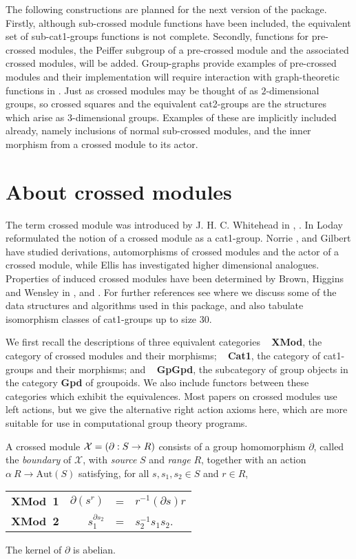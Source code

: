 The following constructions are planned for the next version of the package.
Firstly, although sub-crossed module functions have been included,
the equivalent set of sub-cat1-groups functions is not complete.
Secondly, functions for pre-crossed modules, the Peiffer subgroup of a
pre-crossed module and the associated crossed modules, will be added.
Group-graphs provide examples of pre-crossed modules and their
implementation will require interaction with graph-theoretic
functions in {\GAP}.
Just as crossed modules may be thought of as $2$-dimensional groups, so
crossed squares and the equivalent cat2-groups are the structures
which arise as $3$-dimensional groups.  
Examples of these are implicitly included already, namely inclusions of normal 
sub-crossed modules, and the inner morphism from a crossed module to its actor.


\section{About crossed modules}

The term crossed module was introduced by J. H. C. Whitehead in 
\cite{W2}, \cite{W1}.
In \cite{L1} Loday reformulated the notion of a 
crossed module as a cat1-group.
Norrie \cite{N1}, \cite{N2} and Gilbert \cite{G1} have studied
derivations, automorphisms of crossed modules and the actor 
of a crossed module, while
Ellis \cite{E1} has investigated higher dimensional analogues.
Properties of induced crossed modules have been determined by 
Brown, Higgins and Wensley in \cite{BH1}, \cite{BW1} and \cite{BW2}.
For further references see \cite{AW1} where we discuss some of the
data structures and algorithms used in this package, and also tabulate
isomorphism classes of cat1-groups up to size $30$.

We first recall the descriptions of three equivalent categories\: ~
\textbf{XMod}, the category of crossed modules and their morphisms; ~
\textbf{Cat1}, the category of cat1-groups and their morphisms; and ~
\textbf{GpGpd}, the subcategory of group objects in the category
\textbf{Gpd} of groupoids.
We also include functors between these categories which exhibit
the equivalences.
Most papers on crossed modules use left actions, but we give the
alternative right action axioms here, which are more suitable for
use in computational group theory programs.

A crossed module  ${\cal X} = (\partial \: S \to R )$ 
consists of a group homomorphism $\partial $, 
called the {\em boundary} of $\mathcal{X}$, 
with {\em source} $S$  and {\em range} $R$,
together with an action 
$\alpha \: R \to \mathrm{Aut}(S)$ satisfying,  
for all $s,s_1,s_2 \in S$  and  $r \in R$,
\begin{center}
\begin{tabular}{c r c l }
\textbf{XMod\ 1\:} &  $\partial(s^r)$   &  =  &  $r^{-1} (\partial s) r$ \\
\textbf{XMod\ 2\:} &  $s_1^{\partial s_2}$  &  =  &  $s_2^{-1}s_1 s_2$.
\end{tabular}
\end{center}
The kernel of  $\partial$  is abelian.


